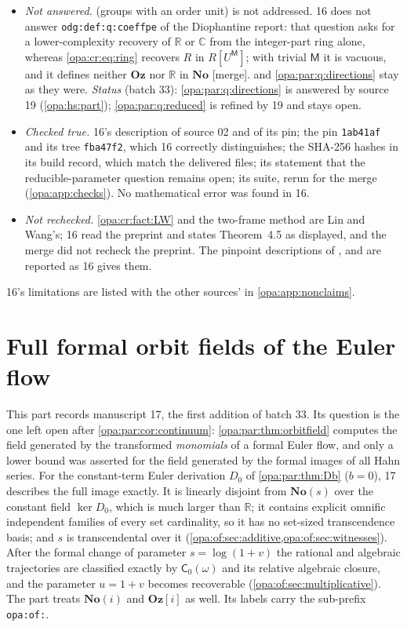 \documentclass[11pt,oneside]{article}
\numberwithin{equation}{section}
\theoremstyle{definition}
\theoremstyle{remark}
\newcommand{\No}{\mathbf{No}}
\newcommand{\Oz}{\mathbf{Oz}}
\newcommand{\Og}{\mathbf{Oz}[i]}
\newcommand{\SC}{\mathbf{No}(i)}
\newcommand{\R}{\mathbb R}
\newcommand{\C}{\mathbb C}
\newcommand{\mergetag}{\textup{\textsf{\small[merge]}}}
\newcommand{\lbl}[1]{\nolinkurl{#1}}
\begin{document}
\begin{itemize}[itemsep=2pt]
\item \emph{Not answered.}  (groups with an order unit) is not addressed. 16 does not answer
\lbl{odg:def:q:coeffpe} of the Diophantine report: that question asks for a lower-complexity recovery of $\R$ or $\C$ from the
integer-part ring alone, whereas \eqref{opa:cr:eq:ring} recovers $R$ in $R[U^{\mathsf M}]$; with trivial $\mathsf M$ it is vacuous, and it
defines neither $\Oz$ nor $\R$ in $\No$ \mergetag.  and \cref{opa:par:q:directions} stay as they were.
\emph{Status} (batch 33): \cref{opa:par:q:directions} is answered by source 19 (\cref{opa:hs:part}); \cref{opa:par:q:reduced} is
refined by 19 and stays open.
\item \emph{Checked true.} 16's description of source 02 and of its pin; the pin \texttt{1ab41af} and its tree
\texttt{fba47f2}, which 16 correctly distinguishes; the SHA-256 hashes in its build record, which match the delivered files;
its statement that the reducible-parameter question remains open; its suite, rerun for the merge (\cref{opa:app:checks}). No
mathematical error was found in 16.
\item \emph{Not rechecked.} \cref{opa:cr:fact:LW} and the two-frame method are Lin and Wang's; 16 read the preprint and
states Theorem~4.5 as displayed, and the merge did not recheck the preprint. The pinpoint descriptions of \cite{Mattarei},
\cite{BL} and \cite{Freudenburg} are reported as 16 gives them.
\end{itemize}

16's limitations are listed with the other sources' in \cref{opa:app:nonclaims}.

\part{Full formal orbit fields of the Euler flow}\label{opa:of:part}

This part records manuscript 17, the first addition of batch 33. Its question is the one left open after
\cref{opa:par:cor:continuum}: \cref{opa:par:thm:orbitfield} computes the field generated by the transformed
\emph{monomials} of a formal Euler flow, and only a lower bound was asserted for the field generated by the formal
images of all Hahn series. For the constant-term Euler derivation $D_0$ of \cref{opa:par:thm:Db} ($b=0$), 17
describes the full image exactly. It is linearly disjoint from $\No(s)$ over the constant field $\ker D_0$, which is
much larger than $\R$; it contains explicit omnific independent families of every set cardinality, so it has no
set-sized transcendence basis; and $s$ is transcendental over it (\cref{opa:of:sec:additive,opa:of:sec:witnesses}).
After the formal change of parameter $s=\log(1+v)$ the rational and algebraic trajectories are classified exactly by
$\mathsf C_0(\omega)$ and its relative algebraic closure, and the parameter $u=1+v$ becomes recoverable
(\cref{opa:of:sec:multiplicative}). The part treats $\SC$ and $\Og$ as well. Its labels carry the sub-prefix
\lbl{opa:of:}.
\end{document}
